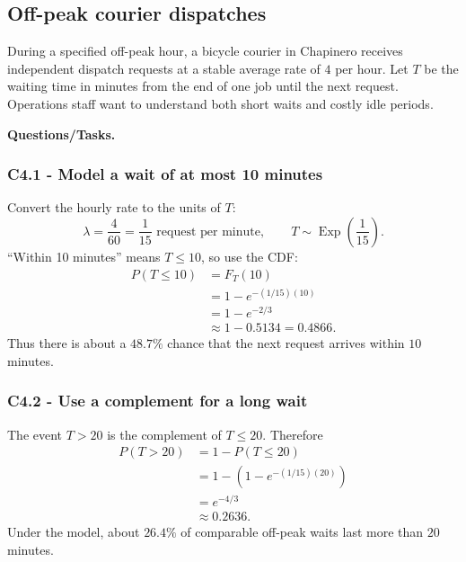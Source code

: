 \subsection{Off-peak courier dispatches}\label{sec:c4-prob-dispatch}
During a specified off-peak hour, a bicycle courier in Chapinero receives
independent dispatch requests at a stable average rate of $4$ per hour.  Let
$T$ be the waiting time in minutes from the end of one job until the next
request.  Operations staff want to understand both short waits and costly idle
periods.

\textbf{Questions/Tasks.}
\begin{enumerate}
\end{enumerate}

\subsubsection*{C4.1 - Model a wait of at most 10 minutes}\label{subsec:c4-prob-dispatch-a}
Convert the hourly rate to the units of $T$:
\[
 \lambda=\frac4{60}=\frac1{15}\text{ request per minute},
 \qquad T\sim\operatorname{Exp}\!\left(\frac1{15}\right).
\]
``Within 10 minutes'' means $T\leq10$, so use the CDF:
\[
\begin{aligned}
 P(T\leq10)
 &=F_T(10)\\
 &=1-e^{-(1/15)(10)}\\
 &=1-e^{-2/3}\\
 &\approx1-0.5134=0.4866.
\end{aligned}
\]
Thus there is about a $48.7\%$ chance that the next request arrives within
$10$ minutes.

\subsubsection*{C4.2 - Use a complement for a long wait}\label{subsec:c4-prob-dispatch-b}
The event $T>20$ is the complement of $T\leq20$.  Therefore
\[
\begin{aligned}
 P(T>20)
 &=1-P(T\leq20)\\
 &=1-\left(1-e^{-(1/15)(20)}\right)\\
 &=e^{-4/3}\\
 &\approx0.2636.
\end{aligned}
\]
Under the model, about $26.4\%$ of comparable off-peak waits last more than
$20$ minutes.

